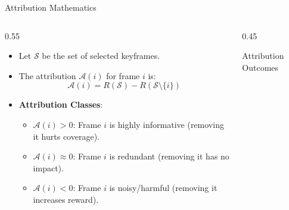 \documentclass[aspectratio=169]{beamer}
\begin{document}
\begin{frame}{Attribution Mathematics}
    \begin{columns}
        \begin{column}{0.55\textwidth}
            \begin{itemize}
                \item Let $\mathcal{S}$ be the set of selected keyframes.
                \item The attribution $\mathcal{A}(i)$ for frame $i$ is:
                \begin{equation*}
                    \mathcal{A}(i) = R(\mathcal{S}) - R(\mathcal{S} \setminus \{i\})
                \end{equation*}
                \item \textbf{Attribution Classes}:
                \begin{itemize}
                    \item $\mathcal{A}(i) > 0$: Frame $i$ is highly informative (removing it hurts coverage).
                    \item $\mathcal{A}(i) \approx 0$: Frame $i$ is redundant (removing it has no impact).
                    \item $\mathcal{A}(i) < 0$: Frame $i$ is noisy/harmful (removing it increases reward).
                \end{itemize}
            \end{itemize}
        \end{column}
        \begin{column}{0.45\textwidth}
            \begin{block}{Attribution Outcomes}
                \centering
            \end{block}
        \end{column}
    \end{columns}
\end{frame}
\end{document}

